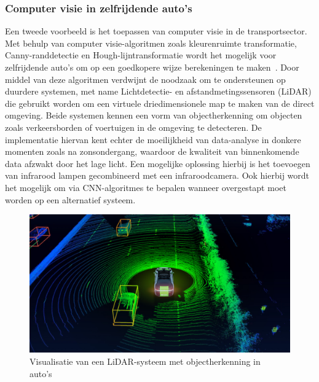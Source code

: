 \subsubsection{Computer visie in zelfrijdende auto's}
Een tweede voorbeeld is het toepassen van computer visie in de transportsector.
Met behulp van computer visie-algoritmen zoals kleurenruimte transformatie, Canny-randdetectie en Hough-lijntransformatie wordt het mogelijk voor zelfrijdende auto's om op een goedkopere wijze berekeningen te maken~\autocite{Gajjar2023}.
Door middel van deze algoritmen verdwijnt de noodzaak om te ondersteunen op duurdere systemen, met name Lichtdetectie- en afstandmetingssensoren (LiDAR) die gebruikt worden om een virtuele driedimensionele map te maken van de direct omgeving.
Beide systemen kennen een vorm van objectherkenning om objecten zoals verkeersborden of voertuigen in de omgeving te detecteren.
De implementatie hiervan kent echter de moeilijkheid van data-analyse in donkere momenten zoals na zonsondergang, waardoor de kwaliteit van binnenkomende data afzwakt door het lage licht.
Een mogelijke oplossing hierbij is het toevoegen van infrarood lampen gecombineerd met een infraroodcamera.
Ook hierbij wordt het mogelijk om via CNN-algoritmes te bepalen wanneer overgestapt moet worden op een alternatief systeem.
\begin{figure}
    \includegraphics[width=1\linewidth]{images/visualisatie-lidar}
    \caption{Visualisatie van een LiDAR-systeem met objectherkenning in auto's~\autocite{Badoni2021}}
    \label{fig:visualisatie-lidar}
\end{figure}


